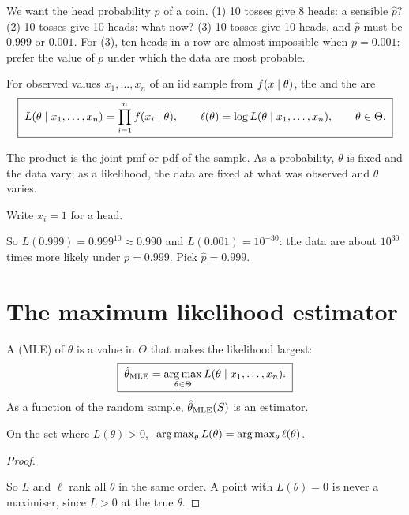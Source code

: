 We want the head probability $p$ of a coin.
(1) 10 tosses give 8 heads: a sensible $\hat p$?
(2) 10 tosses give 10 heads: what now?
(3) 10 tosses give 10 heads, and $\hat p$ must be $0.999$ or $0.001$.
For (3), ten heads in a row are almost impossible when $p=0.001$: prefer the value of $p$ under which the data are most probable.

\begin{definition}[Likelihood]
For observed values $x_1,\dots,x_n$ of an iid sample from $f(x\mid\theta)$, the  and the  are
\[
  \boxed{\;L(\theta\mid x_1,\dots,x_n)=\prod_{i=1}^n f(x_i\mid\theta),\qquad \ell(\theta)=\log L(\theta\mid x_1,\dots,x_n),\qquad\theta\in\Theta.\;}
\]
\end{definition}

The product is the joint pmf or pdf of the sample. As a probability, $\theta$ is fixed and the data vary; as a likelihood, the data are fixed at what was observed and $\theta$ varies.

\begin{example}
Write $x_i=1$ for a head.
\begin{deriv}
\end{deriv}
So $L(0.999)=0.999^{10}\approx0.990$ and $L(0.001)=10^{-30}$: the data are about $10^{30}$ times more likely under $p=0.999$. Pick $\hat p=0.999$.
\end{example}

\section{The maximum likelihood estimator}

\begin{definition}
A  (MLE) of $\theta$ is a value in $\Theta$ that makes the likelihood largest:
\[
  \boxed{\;\hat\theta_{\mathrm{MLE}}=\operatorname*{arg\,max}_{\theta\in\Theta}L(\theta\mid x_1,\dots,x_n).\;}
\]
As a function of the random sample, $\hat\theta_{\mathrm{MLE}}(S)$ is an estimator.
\end{definition}

\begin{result}
On the set where $L(\theta)>0$, $\ \operatorname*{arg\,max}_\theta L(\theta)=\operatorname*{arg\,max}_\theta\ell(\theta)$.
\end{result}
\begin{proof}
\begin{deriv}
\end{deriv}
So $L$ and $\ell$ rank all $\theta$ in the same order. A point with $L(\theta)=0$ is never a maximiser, since $L>0$ at the true $\theta$.
\end{proof}


